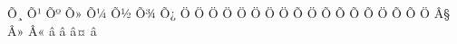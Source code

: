 ^^d5^^b8{\armvo}%
^^d5^^b9{\armcha}%
^^d5^^ba{\armpe}%
^^d5^^bb{\armje}%
^^d5^^bc{\armra}%
^^d5^^bd{\armse}%
^^d5^^be{\armvev}%
^^d5^^bf{\armtyun}%
^^d6^^80{\armre}%
^^d6^^81{\armtso}%
^^d6^^82{\armvyun}%
^^d6^^83{\armpyur}%
^^d6^^84{\armke}%
^^d6^^85{\armo}%
^^d6^^86{\armfe}%
%
%
%
%
^^d6^^89{\armfullstop}%
^^d5^^9d{\armsep}%
^^d6^^8a{\armyentamna}%
^^d5^^9c{\armexclam}%
^^d5^^9b{\armaccent}%
^^d5^^9e{\armquestion}%
^^d5^^9a{\armapostrophe}%
^^d6^^87{\armew}%
^^d5^^9f{\armabbrev}%
^^d5^^99{\armnum}%
^^d6^^8f{\armdram}%
^^c2^^a7{\armsection}%
^^c2^^bb{\armquotright}%
^^c2^^ab{\armquotleft}%
^^e2^^80^^95{\armemdash}%
^^e2^^80^^94{\armemdash}%
^^e2^^80^^a4{\armdot}%
^^e2^^80^^90{\armendash}%
